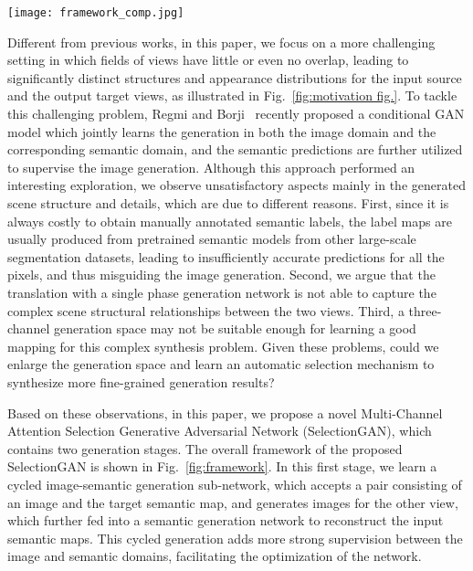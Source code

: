 \documentclass[10pt,twocolumn,letterpaper]{article}
\begin{document}
\begin{figure*}
	\centering
	\texttt{[image: framework\_comp.jpg]}
	\caption{Overview of the proposed SelectionGAN. Stage I presents a cycled semantic-guided generation sub-network which accepts images from one view and conditional semantic maps and simultaneously synthesizes images and semantic maps in another view. Stage II takes the coarse predictions and the learned deep semantic features from stage I, and performs a fine-grained generation using the proposed multi-channel attention selection module.}
	\label{fig:framework}
	\vspace{-0.6cm}
\end{figure*}
\vspace{-0.18cm}
Different from previous works, in this paper, we focus on a more challenging setting in which fields of views have little or even no overlap, leading to significantly distinct structures and appearance distributions for the input source and the output target views, as illustrated in Fig.~\ref{fig:motivation fig.}. To tackle this challenging problem, Regmi and Borji~\cite{regmi2018cross} recently proposed a conditional GAN model which jointly learns the generation in both the image domain and the corresponding semantic domain, and the semantic predictions are further utilized to supervise the image generation. Although this approach performed an interesting exploration, we observe unsatisfactory aspects mainly in the generated scene structure and details, which are due to different reasons. First, since it is always costly to obtain manually annotated semantic labels, the label maps are usually produced from pretrained semantic models from other large-scale segmentation datasets, leading to insufficiently accurate predictions for all the pixels, and thus misguiding the image generation. Second, we argue that the translation with a single phase generation network is not able to capture the complex scene structural relationships between the two views. Third, a three-channel generation space may not be suitable enough for learning a good mapping for this complex synthesis problem. 
Given these problems, could we enlarge the generation space and learn an automatic selection mechanism to synthesize more fine-grained generation results?

Based on these observations, in this paper, we propose a novel Multi-Channel Attention Selection Generative Adversarial Network (SelectionGAN), which contains two generation stages. 
The overall framework of the proposed SelectionGAN is shown in Fig.~\ref{fig:framework}.
In this first stage, we learn a cycled image-semantic generation sub-network, which accepts a pair consisting of an image and the target semantic map, and generates images for the other view, which further fed into a semantic generation network to reconstruct the input semantic maps. This cycled generation adds more strong supervision between the image and semantic domains, facilitating the optimization of the network. 
\end{document}
